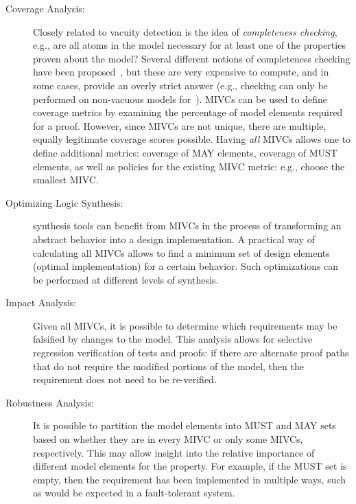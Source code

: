 \begin{description}
    \item [Coverage Analysis:] Closely related to vacuity detection is the idea of {\em completeness checking}, e.g., are all atoms in the model necessary for at least one of the properties proven about the model?  Several different notions of completeness checking have been proposed~\cite{chockler_coverage_2003, kupferman_theory_2008}, but these are very expensive to compute, and in some cases, provide an overly strict answer (e.g., checking can only be performed on non-vacuous models for~\cite{kupferman_theory_2008}). MIVCs can be used to define coverage metrics by examining the percentage of model elements required for a proof.  However, since MIVCs are not unique, there are multiple, equally legitimate coverage scores possible.  Having \emph{all} MIVCs allows one to define additional metrics: coverage of MAY elements, coverage of MUST elements, as well as policies for the existing MIVC metric: e.g., choose the smallest MIVC.
    \item [Optimizing Logic Synthesis:]  synthesis tools can benefit from MIVCs in the process of transforming an abstract behavior into a design implementation. A practical way of calculating all MIVCs allows to find a minimum set of design elements (optimal implementation) for a certain behavior. Such optimizations can be performed at different levels of synthesis.
    \item [Impact Analysis:] Given all MIVCs, it is possible to determine which requirements may be falsified by changes to the model.  This analysis allows for selective regression verification of tests and proofs: if there are alternate proof paths that do not require the modified portions of the model, then the requirement does not need to be re-verified.
    \item [Robustness Analysis:] It is possible to partition the model elements into MUST and MAY sets based on whether they are in every MIVC or only some MIVCs, respectively.  This may allow insight into the relative importance of different model elements for the property.  For example, if the MUST set is empty, then the requirement has been implemented in multiple ways, such as would be expected in a fault-tolerant system.
\end{description}


